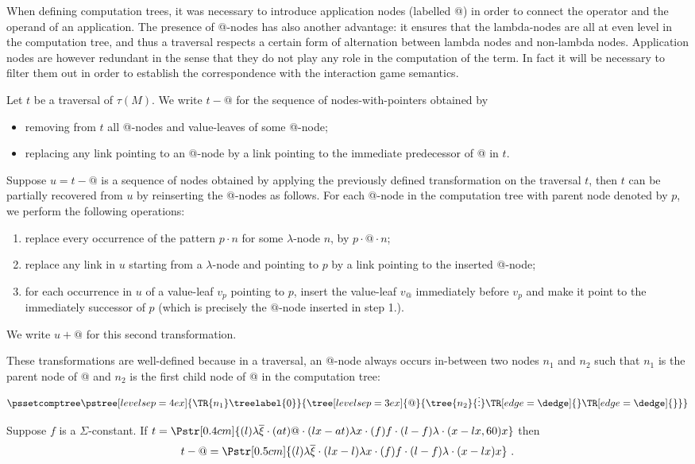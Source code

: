 When defining computation trees, it was necessary to introduce
application nodes (labelled @) in order to connect the operator and
the operand of an application. The presence of @-nodes has also
another advantage: it ensures that the lambda-nodes are all at even
level in the computation tree, and thus a traversal respects a
certain form of alternation between lambda nodes and non-lambda
nodes. Application nodes are however redundant in the sense that
they do not play any role in the computation of the term. In fact it
will be necessary to filter them out in order to establish the
correspondence with the interaction game semantics.

\begin{definition}
\label{dfn:appnode_filter} Let $t$ be a traversal of $\tau(M)$. We
write $t-@$ for the sequence of nodes-with-pointers obtained by
\begin{itemize}
\item removing from $t$ all @-nodes and value-leaves of some @-node;
\item replacing any link pointing to an @-node by a link pointing to the immediate predecessor of @ in $t$.
\end{itemize}


Suppose $u = t-@$ is a sequence of nodes obtained by applying the
previously defined transformation on the traversal $t$, then $t$ can
be partially recovered from $u$ by reinserting the @-nodes as
follows. For each @-node in the computation tree with parent node
denoted by $p$, we perform the following operations:
\begin{enumerate}
\item replace every occurrence of the pattern $p \cdot n$ for some $\lambda$-node $n$, by $p \cdot @ \cdot n$;
\item replace any link in $u$ starting from a $\lambda$-node and pointing to $p$ by a link pointing to the inserted @-node;
\item for each occurrence in $u$ of a value-leaf $v_p$ pointing to $p$, insert the value-leaf $v_@$
    immediately before $v_p$ and make it point to the
    immediately successor of $p$ (which is precisely the $@$-node
inserted in step 1.).
\end{enumerate}
We write $u+@$ for this second transformation.
\end{definition}
These transformations are well-defined because in a traversal, an
@-node always occurs in-between two nodes $n_1$ and $n_2$ such that
$n_1$ is the parent node of @ and $n_2$ is the first child node of @
in the computation tree:
$$      \pssetcomptree\pstree[levelsep=4ex]{\TR{n_1}\treelabel{0} }
        {
            \tree[levelsep=3ex]{@}
            {
                \tree{n_2}{\vdots}
                \TR[edge=\dedge]{}
                \TR[edge=\dedge]{}
            }
        }
$$
\begin{example} Suppose $f$ is a $\Sigma$-constant.
If $t = \Pstr[0.4cm]{ (l){\lambda \overline{\xi}} \cdot (at)@ \cdot (lx-at){\lambda x}\cdot (f)f \cdot (l-f){\lambda} \cdot (x-lx,60)x}$ then
$$t-@ = \Pstr[0.5cm]{ (l){\lambda \overline{\xi}}
 \cdot (lx-l){\lambda x}\cdot (f)f\cdot (l-f){\lambda} \cdot (x-lx)x} \ .$$
\end{example}


